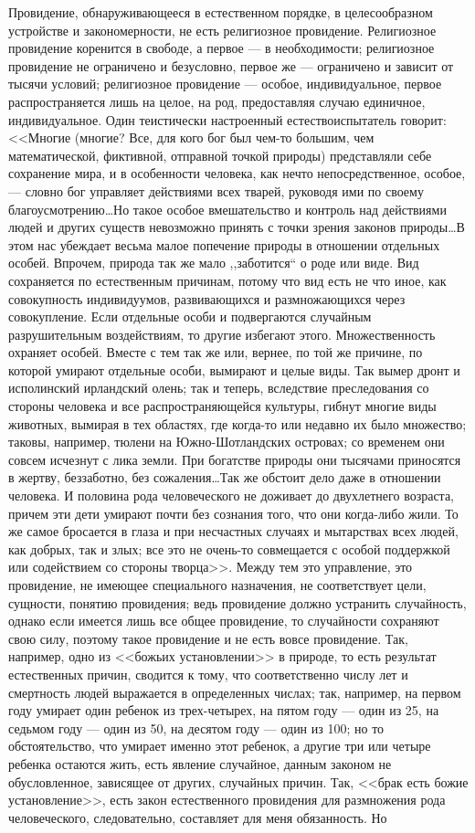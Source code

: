 \documentclass[12pt]{article}
\begin{document}
Провидение, обнаруживающееся в естественном порядке, в целесообразном устройстве и закономерности, не есть религиозное провидение. Религиозное провидение коренится в свободе, а первое --- в необходимости; религиозное провидение не ограничено и безусловно, первое же --- ограничено и зависит от тысячи условий; религиозное провидение --- особое, индивидуальное, первое распространяется лишь на целое, на род, предоставляя случаю единичное, индивидуальное. Один теистически настроенный естествоиспытатель говорит: <<Многие (многие? Все, для кого бог был чем-то большим, чем математической, фиктивной, отправной точкой природы) представляли себе сохранение мира, и в особенности человека, как нечто непосредственное, особое, --- словно бог управляет действиями всех тварей, руководя ими по своему благоусмотрению\dots Но такое особое вмешательство и контроль над действиями людей и других существ невозможно принять с точки зрения законов природы\dots В этом нас убеждает весьма малое попечение природы в отношении отдельных особей. Впрочем, природа так же мало ,,заботится`` о роде или виде. Вид сохраняется по естественным причинам, потому что вид есть не что иное, как совокупность индивидуумов, развивающихся и размножающихся через совокупление. Если отдельные особи и подвергаются случайным разрушительным воздействиям, то другие избегают этого. Множественность охраняет особей. Вместе с тем так же или, вернее, по той же причине, по которой умирают отдельные особи, вымирают и целые виды. Так вымер дронт и исполинский ирландский олень; так и теперь, вследствие преследования со стороны человека и все распространяющейся культуры, гибнут многие виды животных, вымирая в тех областях, где когда-то или недавно их было множество; таковы, например, тюлени на Южно-Шотландских островах; со временем они совсем исчезнут с лика земли. При богатстве природы они тысячами приносятся в жертву, беззаботно, без сожаления\dots Так же обстоит дело даже в отношении человека. И половина рода человеческого не доживает до двухлетнего возраста, причем эти дети умирают почти без сознания того, что они когда-либо жили. То же самое бросается в глаза и при несчастных случаях и мытарствах всех людей, как добрых, так и злых; все это не очень-то совмещается с особой поддержкой или содействием со стороны творца>>. Между тем это управление, это провидение, не имеющее специального назначения, не соответствует цели, сущности, понятию провидения; ведь провидение должно устранить случайность, однако если имеется лишь все общее провидение, то случайности сохраняют свою силу, поэтому такое провидение и не есть вовсе провидение. Так, например, одно из <<божьих установлении>> в природе, то есть результат естественных причин, сводится к тому, что соответственно числу лет и смертность людей выражается в определенных числах; так, например, на первом году умирает один ребенок из трех-четырех, на пятом году --- один из 25, на седьмом году --- один из 50, на десятом году --- один из 100; но то обстоятельство, что умирает именно этот ребенок, а другие три или четыре ребенка остаются жить, есть явление случайное, данным законом не обусловленное, зависящее от других, случайных причин. Так, <<брак есть божие установление>>, есть закон естественного провидения для размножения рода человеческого, следовательно, составляет для меня обязанность. Но 
\end{document}
